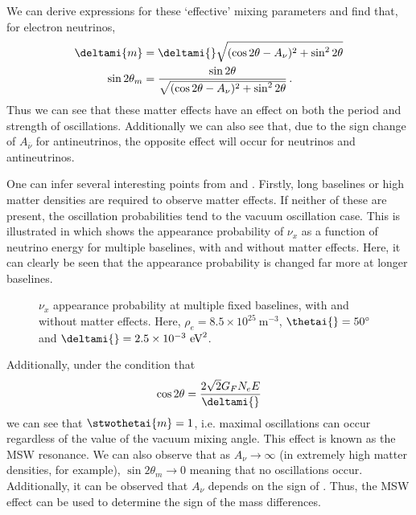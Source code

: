 We can derive expressions for these `effective' mixing parameters and find that, for electron neutrinos,
\begin{align}
  \deltami{m} &= \deltami{} \sqrt{ (\cos 2\theta - A_{\nu})^{2} + \sin^{2} 2\theta }  \label{eq:mswMass} \\
  \sin 2\theta_{m} &= \frac{\sin 2\theta}{\sqrt{ (\cos 2\theta - A_{\nu})^{2} + \sin^{2} 2\theta }} \, . \label{eq:mswAngle}
\end{align}
Thus we can see that these matter effects have an effect on both the period and strength of oscillations.
Additionally we can also see that, due to the sign change of $A_{\overline{\nu}}$ for antineutrinos, the opposite effect will occur for neutrinos and antineutrinos. 

One can infer several interesting points from  and .
Firstly, long baselines or high matter densities are required to observe matter effects.
If neither of these are present, the oscillation probabilities tend to the vacuum oscillation case.
This is illustrated in  which shows the appearance probability of $\nu_{x}$ as a function of neutrino energy for multiple baselines, with and without matter effects.
Here, it can clearly be seen that the appearance probability is changed far more at longer baselines.

\begin{figure}[h]
  \centering
  \begin{adjustbox}{max totalsize={.6\textwidth}, center}
    
  \end{adjustbox}
  \caption[Two neutrino appearance probabilities with and without matter effects.]{$\nu_{x}$ appearance probability at multiple fixed baselines, with and without matter effects. Here, $\rho_{e} = 8.5 \times 10^{25}~\text{m}^{-3}$, $\thetai{} = 50^{\circ}$ and $\deltami{} = 2.5 \times 10^{-3}~\text{eV}^{2}$.}
  \label{fig:twoNuMSW}
\end{figure}

Additionally, under the condition that
\begin{equation}
  \cos 2\theta = \frac{2 \sqrt{2} G_{F} N_{e} E}{\deltami{}}
\end{equation}
we can see that $\stwothetai{m} = 1$, i.e. maximal oscillations can occur regardless of the value of the vacuum mixing angle.
This effect is known as the MSW resonance.
We can also observe that as $A_{\nu} \rightarrow \infty$ (in extremely high matter densities, for example), $\sin 2\theta_{m} \rightarrow 0$ meaning that no oscillations occur.
Additionally, it can be observed that $A_{\nu}$ depends on the sign of \deltami{}.
Thus, the MSW effect can be used to determine the sign of the mass differences.

